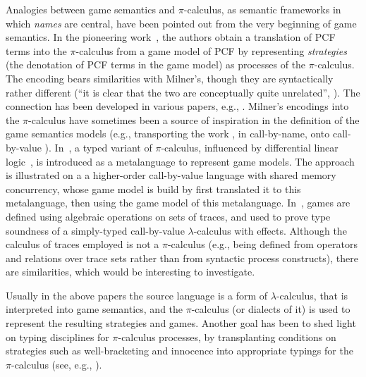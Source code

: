 
Analogies between game semantics and $\pi$-calculus, as semantic frameworks in which
\emph{names} are central, have been pointed out from the very beginning of game
semantics. 
In the pioneering work~\cite{10.1145/224164.224189}, the authors 
obtain 
 a translation of PCF terms into the $\pi$-calculus from 
a game model of PCF by representing 
 \emph{strategies} 
(the denotation of PCF terms in the game model) as processes of the $\pi$-calculus.
The encoding bears similarities with Milner's, though they are syntactically rather
different (``it is clear that the two are conceptually quite unrelated'',
\cite{10.1145/224164.224189}).   The connection has been  developed in various papers,
e.g.,
\cite{DBLP:journals/entcs/Honda02,10.1016/S0304-3975-99-00039-0,10.5555/788020.788890,yoshida2020game,10.1145/3290340}.
Milner's encodings into the $\pi$-calculus have sometimes  been a source of inspiration  in
the definition of the game semantics models (e.g.,  transporting 
 the work 
\cite{10.1145/224164.224189}, in call-by-name, onto call-by-value
 \cite{10.1016/S0304-3975-99-00039-0}).  
In~\cite{yoshida2020game}, a  typed variant of  $\pi$-calculus, influenced by 
differential linear logic~\cite{ehrhard2018introduction},
is introduced as a metalanguage to represent game models.
\iflong 
 The approach is illustrated on a
a higher-order call-by-value language with shared memory concurrency, whose game model is build by first translated it
to this metalanguage, then using the game model of this metalanguage.
\fi
In~\cite{10.1109/LICS.2015.20}, games are defined using algebraic operations on sets of
traces, and used to  prove type soundness of a simply-typed call-by-value
$\lambda$-calculus with effects.
 Although the calculus of traces employed is not a $\pi$-calculus 
(e.g., being defined from operators and relations over trace sets rather than from
syntactic process constructs), there are similarities, which would be interesting to
investigate. 



Usually in the above  papers
the source language is a form of $\lambda$-calculus, 
that is interpreted into game semantics,  
and the 
 $\pi$-calculus  (or dialects of it)  is used to
represent the resulting strategies and games. 
Another goal has been to shed light on typing
disciplines  for 
$\pi$-calculus processes, by transplanting conditions on strategies such as well-bracketing
and innocence into appropriate typings for the $\pi$-calculus (see, e.g., 
\cite{berger2001sequentiality,YBH11,HirschkoffPS21}). 


